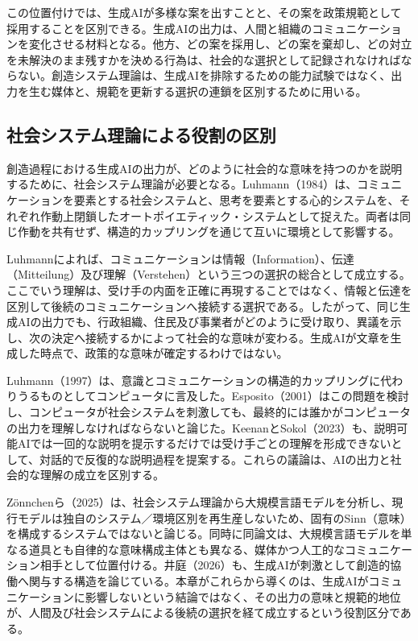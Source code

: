 この位置付けでは、生成AIが多様な案を出すことと、その案を政策規範として採用することを区別できる。生成AIの出力は、人間と組織のコミュニケーションを変化させる材料となる。他方、どの案を採用し、どの案を棄却し、どの対立を未解決のまま残すかを決める行為は、社会的な選択として記録されなければならない。創造システム理論は、生成AIを排除するための能力試験ではなく、出力を生む媒体と、規範を更新する選択の連鎖を区別するために用いる。

\subsection{社会システム理論による役割の区別}

創造過程における生成AIの出力が、どのように社会的な意味を持つのかを説明するために、社会システム理論が必要となる。Luhmann（1984）は、コミュニケーションを要素とする社会システムと、思考を要素とする心的システムを、それぞれ作動上閉鎖したオートポイエティック・システムとして捉えた\cite{luhmann1984systeme}。両者は同じ作動を共有せず、構造的カップリングを通じて互いに環境として影響する\cite{luhmann1984systeme,maturana1980autopoiesis}。

Luhmannによれば、コミュニケーションは情報（Information）、伝達（Mitteilung）及び理解（Verstehen）という三つの選択の総合として成立する\cite{luhmann1984systeme,kneer1993luhmanns}。ここでいう理解は、受け手の内面を正確に再現することではなく、情報と伝達を区別して後続のコミュニケーションへ接続する選択である。したがって、同じ生成AIの出力でも、行政組織、住民及び事業者がどのように受け取り、異議を示し、次の決定へ接続するかによって社会的な意味が変わる。生成AIが文章を生成した時点で、政策的な意味が確定するわけではない。

Luhmann（1997）は、意識とコミュニケーションの構造的カップリングに代わりうるものとしてコンピュータに言及した\cite{luhmann1997gesellschaft}。Esposito（2001）はこの問題を検討し、コンピュータが社会システムを刺激しても、最終的には誰かがコンピュータの出力を理解しなければならないと論じた\cite{esposito2001coupling}。KeenanとSokol（2023）も、説明可能AIでは一回的な説明を提示するだけでは受け手ごとの理解を形成できないとして、対話的で反復的な説明過程を提案する\cite{keenan2023mind}。これらの議論は、AIの出力と社会的な理解の成立を区別する。

Zönnchenら（2025）は、社会システム理論から大規模言語モデルを分析し、現行モデルは独自のシステム／環境区別を再生産しないため、固有のSinn（意味）を構成するシステムではないと論じる\cite{zonnchen2025autopoiesis}。同時に同論文は、大規模言語モデルを単なる道具とも自律的な意味構成主体とも異なる、媒体かつ人工的なコミュニケーション相手として位置付ける。井庭（2026）も、生成AIが刺激として創造的協働へ関与する構造を論じている\cite{iba2026creative}。本章がこれらから導くのは、生成AIがコミュニケーションに影響しないという結論ではなく、その出力の意味と規範的地位が、人間及び社会システムによる後続の選択を経て成立するという役割区分である。

